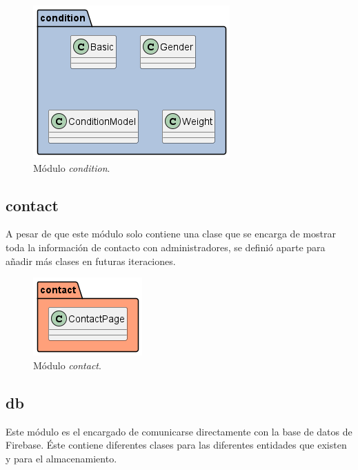 \documentclass[a4paper, 12pt]{article}
\begin{document}
\begin{figure}[H]
	\begin{center}
		{\includegraphics[]{diagram/Condition.png}\par}
		\caption{Módulo \textit{condition}.}
	\end{center}
\end{figure}

\subsection*{contact}

A pesar de que este módulo solo contiene una clase que se encarga de mostrar toda la información de contacto con administradores, se definió aparte para añadir más clases en futuras iteraciones.

\begin{figure}[H]
	\begin{center}
		{\includegraphics[]{diagram/Contact.png}\par}
		\caption{Módulo \textit{contact}.}
	\end{center}
\end{figure}


\subsection*{db}

Este módulo es el encargado de comunicarse directamente con la base de datos de Firebase. Éste contiene diferentes clases para las diferentes entidades que existen y para el almacenamiento.
\end{document}
